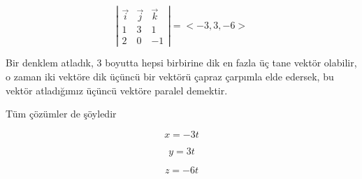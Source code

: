 \documentclass[12pt,fleqn]{article}\usepackage{../../common}
\begin{document}
$$ 
\left|\begin{array}{rrr}
\vec{i} & \vec{j} & \vec{k}  \\
1 & 3 & 1 \\
2 & 0 & -1
\end{array}\right| = < -3,3,-6 >
$$

Bir denklem atladık, 3 boyutta hepsi birbirine dik en fazla üç tane vektör
olabilir, o zaman iki vektöre dik üçüncü bir vektörü çapraz çarpımla elde
edersek, bu vektör atladığımız üçüncü vektöre paralel demektir.

Tüm çözümler de şöyledir

$$ x = -3t $$

$$ y = 3t $$

$$ z = -6t $$
\end{document}
